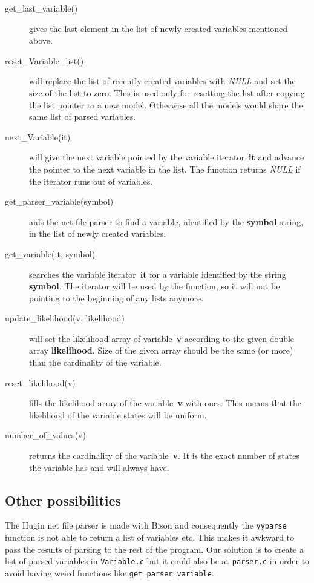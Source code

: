 \documentclass[12pt,a4paper]{report}
\begin{document}
\begin{description}
\item[get\_last\_variable()] gives the last element in the list
of newly created variables mentioned above.

\item[reset\_Variable\_list()] will replace the list of recently created
variables with {\it NULL} and set the size of the list to zero. This
is used only for resetting the list after copying the list pointer
to a new model. Otherwise all the models would share the same list of
parsed variables.

\item[next\_Variable(it)] will give the next variable pointed by the
variable iterator~\textbf{it} and advance the pointer to the next
variable in the list. The function returns {\it NULL} if the iterator
runs out of variables.

\item[get\_parser\_variable(symbol)] aids the net file parser to find a
variable, identified by the \textbf{symbol} string, in the list of newly
created variables.

\item[get\_variable(it, symbol)] searches the
variable iterator~\textbf{it} for a variable identified by the string
\textbf{symbol}. The iterator will be used by the function, so it will
not be pointing to the beginning of any lists anymore.

\item[update\_likelihood(v, likelihood)] will set the likelihood array
of variable~\textbf{v} according to the given double array 
\textbf{likelihood}. Size of the given array should be the same 
(or more) than the cardinality of the variable.

\item[reset\_likelihood(v)] fills the likelihood array of the
variable~\textbf{v} with ones. This means that the likelihood of the
variable states will be uniform.

\item[number\_of\_values(v)] returns the cardinality of the
variable~\textbf{v}. It is the exact number of states the variable has
and will always have.
\end{description}


\subsection{Other possibilities}
The Hugin net file parser is made with Bison and consequently the 
\verb+yyparse+ function is not able to return a list of variables etc. 
This makes it awkward to pass the results of parsing to the rest of the
program. Our solution is to create a list of parsed variables in
\verb+Variable.c+ but it could also be at \verb+parser.c+ in order to
avoid having weird functions like \verb+get_parser_variable+.
\end{document}
